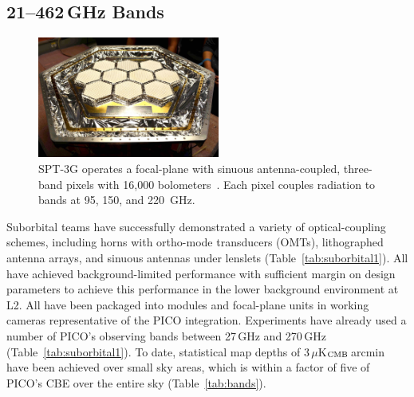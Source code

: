 \subsection{21--462\,GHz Bands}
\label{sec:bolometers} %
%
\begin{figure}  %
\vspace{-15pt} %
\parbox{2.35in}{
\includegraphics[width=2.35in]{figures/SPT3G.jpg} }  %
\parbox{1.40in}{
\caption{\captiontext SPT-3G operates a focal-plane with sinuous antenna-coupled, three-band pixels with
16,000 bolometers~\citep{Dutcher2018}. Each pixel couples radiation to bands at 95, 150, and
220~GHz.
\label{fig:spt_fp} }
}
\end{figure}
%
Suborbital teams have successfully demonstrated a variety of optical-coupling schemes, including horns with ortho-mode transducers (OMTs), lithographed antenna arrays, and sinuous antennas under lenslets (Table~\ref{tab:suborbital1}). All have achieved background-limited performance with sufficient margin on design parameters to achieve this performance in the lower background environment at L2. All have been packaged into modules and focal-plane units in working cameras representative of the PICO integration. Experiments have already used a number of PICO's observing bands between 27\,GHz and 270\,GHz (Table~\ref{tab:suborbital1}).  To date, statistical map depths of 3\,$\mu$K$_{\rm CMB}$\,arcmin have been achieved over small sky areas, which is within a factor of five of PICO's CBE over the entire sky (Table~\ref{tab:bands}). %





